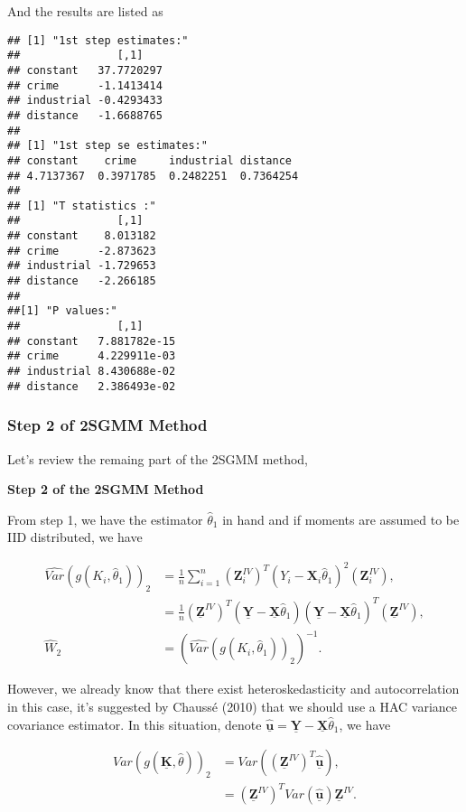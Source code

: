 \documentclass[
  12pt,
]{article}
\begin{document}
And the results are listed as

\begin{verbatim}
## [1] "1st step estimates:"
##               [,1]
## constant   37.7720297
## crime      -1.1413414
## industrial -0.4293433
## distance   -1.6688765
##
## [1] "1st step se estimates:"
## constant    crime     industrial distance 
## 4.7137367  0.3971785  0.2482251  0.7364254
## 
## [1] "T statistics :"
##               [,1]
## constant    8.013182
## crime      -2.873623
## industrial -1.729653
## distance   -2.266185
##
##[1] "P values:"
##               [,1]
## constant   7.881782e-15
## crime      4.229911e-03
## industrial 8.430688e-02
## distance   2.386493e-02
\end{verbatim}

\hypertarget{step-2-of-2sgmm-method}{%
\subsubsection{Step 2 of 2SGMM Method}\label{step-2-of-2sgmm-method}}

Let's review the remaing part of the 2SGMM method,

\noindent
\textbf{\color{blue} Step 2 of the 2SGMM Method}

\noindent
\color{black}From step 1, we have the estimator \(\hat{\theta}_1\) in hand and if moments are assumed to be IID distributed, we have

\begin{align*}
    \widehat{Var}(g(K_i, \widehat{\theta}_1))_2 
    & = \frac{1}{n}\sum_{i=1}^{n}(\mathbf{Z}_{i}^{IV})^T (Y_i - \mathbf{X}_i \hat{\theta}_1)^2 (\mathbf{Z}_{i}^{IV}),\\
    & = \frac{1}{n} (\mathbf{\underline{Z}}^{IV})^T (\mathbf{\underline{Y}} - \mathbf{\underline{X}} \hat{\theta}_1) (\mathbf{\underline{Y}} - \mathbf{\underline{X}} \hat{\theta}_1)^T (\mathbf{\underline{Z}}^{IV}),\\
    \widehat{W}_2 & = \left(\widehat{Var}(g(K_i, \widehat{\theta}_1))_2 \right)^{-1}.
\end{align*}

However, we already know that there exist heteroskedasticity and autocorrelation in this case, it's suggested by Chaussé (2010) that we should use a HAC variance covariance estimator. In this situation, denote \(\hat{\mathbf{\underline{u}}} = \mathbf{\underline{Y}} - \mathbf{\underline{X}} \hat{\theta}_1\), we have

\begin{align*}
    Var(g(\mathbf{\underline{K}}, \widehat{\theta}))_2 
    & = Var\left((\mathbf{\underline{Z}}^{IV})^T \hat{\mathbf{\underline{u}}} \right),\\
    & = (\mathbf{\underline{Z}}^{IV})^T Var(\hat{\mathbf{\underline{u}}}) \mathbf{\underline{Z}}^{IV}.
\end{align*}
\end{document}

